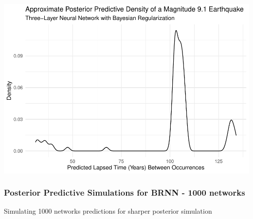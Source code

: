 \begin{Shaded}
\begin{Highlighting}[]
\NormalTok{(} \SpecialCharTok{/}\SpecialCharTok{\^{}}\SpecialCharTok{+}
\NormalTok{() }\SpecialCharTok{+} 
    \NormalTok{(} \NormalTok{,}
          \NormalTok{,}
          \NormalTok{,}
          \NormalTok{) }\SpecialCharTok{+}
  \NormalTok{()}
\end{Highlighting}
\end{Shaded}

\includegraphics[width =.6\linewidth]
{earthquakes_files/figure-latex/unnamed-chunk-14-2.pdf}

\hypertarget{posterior-predictive-simulations-for-brnn---1000-networks}{%
\subsubsection{Posterior Predictive Simulations for BRNN - 1000
networks}\label{posterior-predictive-simulations-for-brnn---1000-networks}}

Simulating 1000 networks predictions for sharper posterior simulation

